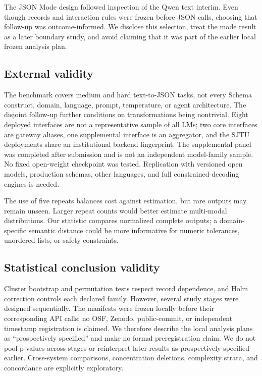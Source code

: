 \documentclass[11pt,a4paper]{article}
\begin{document}
The JSON Mode design followed inspection of the Qwen text interim. Even though records and interaction rules were frozen before JSON calls, choosing that follow-up was outcome-informed. We disclose this selection, treat the mode result as a later boundary study, and avoid claiming that it was part of the earlier local frozen analysis plan.

\subsection{External validity}
The benchmark covers medium and hard text-to-JSON tasks, not every Schema construct, domain, language, prompt, temperature, or agent architecture. The disjoint follow-up further conditions on transformations being nontrivial. Eight deployed interfaces are not a representative sample of all LMs; two core interfaces are gateway aliases, one supplemental interface is an aggregator, and the SJTU deployments share an institutional backend fingerprint. The supplemental panel was completed after submission and is not an independent model-family sample. No fixed open-weight checkpoint was tested. Replication with versioned open models, production schemas, other languages, and full constrained-decoding engines is needed.

The use of five repeats balances cost against estimation, but rare outputs may remain unseen. Larger repeat counts would better estimate multi-modal distributions. Our statistic compares normalized complete outputs; a domain-specific semantic distance could be more informative for numeric tolerances, unordered lists, or safety constraints.

\subsection{Statistical conclusion validity}
Cluster bootstrap and permutation tests respect record dependence, and Holm correction controls each declared family. However, several study stages were designed sequentially. The manifests were frozen locally before their corresponding API calls; no OSF, Zenodo, public-commit, or independent timestamp registration is claimed. We therefore describe the local analysis plans as ``prospectively specified'' and make no formal preregistration claim. We do not pool p-values across stages or reinterpret later results as prospectively specified earlier. Cross-system comparisons, concentration deletions, complexity strata, and concordance are explicitly exploratory.
\end{document}
